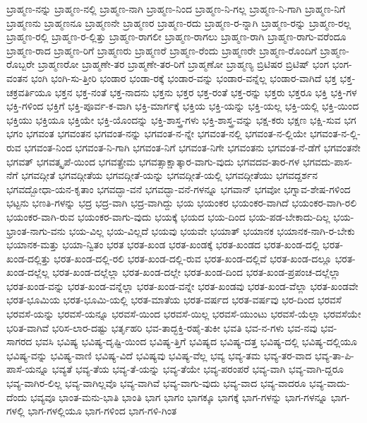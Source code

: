{ಬ್ರಾಹ್ಮಣ-ನನ್ನು
ಬ್ರಾಹ್ಮಣ-ನಲ್ಲಿ
ಬ್ರಾಹ್ಮಣ-ನಾಗಿ
ಬ್ರಾಹ್ಮಣ-ನಿಂದ
ಬ್ರಾಹ್ಮಣ-ನಿ-ಗಲ್ಲ
ಬ್ರಾಹ್ಮಣ-ನಿ-ಗಾಗಿ
ಬ್ರಾಹ್ಮಣ-ನಿಗೆ
ಬ್ರಾಹ್ಮಣನು
ಬ್ರಾಹ್ಮಣನೂ
ಬ್ರಾಹ್ಮಣನೇ
ಬ್ರಾಹ್ಮಣರ
ಬ್ರಾಹ್ಮಣ-ರದು
ಬ್ರಾಹ್ಮಣ-ರ-ನ್ನಾಗಿ
ಬ್ರಾಹ್ಮಣ-ರನ್ನು
ಬ್ರಾಹ್ಮಣ-ರಲ್ಲ
ಬ್ರಾಹ್ಮಣ-ರಲ್ಲಿ
ಬ್ರಾಹ್ಮಣ-ರ-ಲ್ಲಿತ್ತು
ಬ್ರಾಹ್ಮಣ-ರಾಗಲೀ
ಬ್ರಾಹ್ಮಣ-ರಾಗಲು
ಬ್ರಾಹ್ಮಣ-ರಾಗಿ
ಬ್ರಾಹ್ಮಣ-ರಾಗು-ವರೆಂದೂ
ಬ್ರಾಹ್ಮಣ-ರಾದ
ಬ್ರಾಹ್ಮಣ-ರಿಗೆ
ಬ್ರಾಹ್ಮಣರು
ಬ್ರಾಹ್ಮಣರೆ
ಬ್ರಾಹ್ಮಣ-ರೆಂದು
ಬ್ರಾಹ್ಮಣರೇ
ಬ್ರಾಹ್ಮಣ-ರೊಂದಿಗೆ
ಬ್ರಾಹ್ಮಣ-ರೊಬ್ಬರೇ
ಬ್ರಾಹ್ಮಣರೋ
ಬ್ರಾಹ್ಮಣೇ-ತರ
ಬ್ರಾಹ್ಮಣೇ-ತರ-ರಿಗೆ
ಬ್ರಾಹ್ಮಣೋ
ಬ್ರಾಹ್ಮಣ್ಯ
ಬ್ರಿಟಿಷರ
ಬ್ರಿಟಿಷ್
ಭಂಗ
ಭಂಗ-ವಂತನ
ಭಂಗಿ
ಭಂಗಿ-ಸು-ತ್ತೀರಿ
ಭಂಡಾರ
ಭಂಡಾ-ರಕ್ಕೆ
ಭಂಡಾರ-ವನ್ನು
ಭಂಡಾರ-ವನ್ನೆಲ್ಲ
ಭಂಡಾರ-ವಾಗಿದೆ
ಭಕ್ತ
ಭಕ್ತ-ಚಕ್ರವರ್ತಿಯೂ
ಭಕ್ತನ
ಭಕ್ತ-ನಂತೆ
ಭಕ್ತ-ನಾದನು
ಭಕ್ತನು
ಭಕ್ತರ
ಭಕ್ತ-ರಂತೆ
ಭಕ್ತ-ರನ್ನು
ಭಕ್ತರು
ಭಕ್ತರೂ
ಭಕ್ತಿ
ಭಕ್ತಿ-ಗಳ
ಭಕ್ತಿ-ಗಳಿಂದ
ಭಕ್ತಿಗೆ
ಭಕ್ತಿ-ಪೂರ್ವ-ಕ-ವಾಗಿ
ಭಕ್ತಿ-ಮಾರ್ಗಕ್ಕೆ
ಭಕ್ತಿಯ
ಭಕ್ತಿ-ಯನ್ನು
ಭಕ್ತಿ-ಯಲ್ಲ
ಭಕ್ತಿ-ಯಲ್ಲಿ
ಭಕ್ತಿ-ಯಿಂದ
ಭಕ್ತಿಯು
ಭಕ್ತಿಯೂ
ಭಕ್ತಿಯೇ
ಭಕ್ತಿ-ಯೊಂದನ್ನು
ಭಕ್ತಿ-ಶಾಸ್ತ್ರ-ಗಳು
ಭಕ್ತಿ-ಶಾಸ್ತ್ರ-ವನ್ನು
ಭಕ್ಷ-ಕರು
ಭಕ್ಷಣ
ಭಕ್ಷಿ-ಸುವ
ಭಗ
ಭಗಂ
ಭಗವಂತ
ಭಗವಂತನ
ಭಗವಂತ-ನನ್ನು
ಭಗವಂತ-ನ-ನ್ನೇ
ಭಗವಂತ-ನಲ್ಲಿ
ಭಗವಂತ-ನ-ಲ್ಲಿಯೇ
ಭಗವಂತ-ನ-ಲ್ಲಿ-ರುವ
ಭಗವಂತ-ನಿಂದ
ಭಗವಂತ-ನಿ-ಗಾಗಿ
ಭಗವಂತ-ನಿಗೆ
ಭಗವಂತ-ನಿಗೇ
ಭಗವಂತನು
ಭಗವಂತ-ನೆ-ಡೆಗೆ
ಭಗವಂತನೇ
ಭಗವತ್
ಭಗವತ್ಕೃಪೆ-ಯಿಂದ
ಭಗವತ್ಪ್ರೇಮ
ಭಗವತ್ಸಾಕ್ಷಾತ್ಕಾರ-ವಾಗು-ವುದು
ಭಗವದವ-ತಾರ-ಗಳ
ಭಗವದು-ಪಾಸ-ನೆಗೆ
ಭಗವದ್ಗೀತೆ
ಭಗವದ್ಗೀತೆಯ
ಭಗವದ್ಗೀತೆ-ಯನ್ನು
ಭಗವದ್ಗೀತೆ-ಯಲ್ಲಿ
ಭಗವದ್ಗೀತೆಯು
ಭಗವದ್ದರ್ಶನ
ಭಗವದ್ಬೋಧಾ-ಯನ-ಕೃತಾಂ
ಭಗವದ್ಭಾ-ವನೆ
ಭಗವದ್ಭಾ-ವನೆ-ಗಳನ್ನೂ
ಭಗವಾನ್
ಭಗವೋ
ಭಗ್ನಾವ-ಶೇಷ-ಗಳಿಂದ
ಭಟ್ಟನು
ಭಣತಿ-ಗಳನ್ನು
ಭದ್ರ
ಭದ್ರ-ವಾಗಿ
ಭದ್ರ-ವಾಗಿದ್ದು
ಭಯ
ಭಯಂಕರ
ಭಯಂಕರ-ವಾಗಿದೆ
ಭಯಂಕರ-ವಾಗಿ-ರಲಿ
ಭಯಂಕರ-ವಾಗಿ-ರುವ
ಭಯಂಕರ-ವಾಗು-ವುದು
ಭಯಕ್ಕೆ
ಭಯದ
ಭಯ-ದಿಂದ
ಭಯ-ಪಡ-ಬೇಕಾದು-ದಿಲ್ಲ
ಭಯ-ಭ್ರಾಂತ-ನಾಗು-ವನು
ಭಯ-ವಿಲ್ಲ
ಭಯ-ವಿಲ್ಲದೆ
ಭಯವು
ಭಯವೇ
ಭಯಾತ್
ಭಯಾನಕ
ಭಯಾನಕ-ನಾಗಿ-ರ-ಬೇಕು
ಭಯಾನಕ-ಮತ್ತು
ಭಯಾ-ನ್ವಿತಂ
ಭರತ
ಭರತ-ಖಂಡ
ಭರತ-ಖಂಡಕ್ಕೆ
ಭರತ-ಖಂಡದ
ಭರತ-ಖಂಡ-ದಲ್ಲಿ
ಭರತ-ಖಂಡ-ದಲ್ಲಿತ್ತು
ಭರತ-ಖಂಡ-ದಲ್ಲಿ-ರಲಿ
ಭರತ-ಖಂಡ-ದಲ್ಲಿ-ರುವ
ಭರತ-ಖಂಡ-ದಲ್ಲಿವೆ
ಭರತ-ಖಂಡ-ದಲ್ಲೂ
ಭರತ-ಖಂಡ-ದಲ್ಲೆಲ್ಲ
ಭರತ-ಖಂಡ-ದಲ್ಲೆಲ್ಲಾ
ಭರತ-ಖಂಡ-ದಲ್ಲೇ
ಭರತ-ಖಂಡ-ದಿಂದ
ಭರತ-ಖಂಡ-ಪ್ರಪಂಚ-ದಲ್ಲೆಲ್ಲಾ
ಭರತ-ಖಂಡ-ವನ್ನು
ಭರತ-ಖಂಡ-ವನ್ನೆಲ್ಲಾ
ಭರತ-ಖಂಡ-ವನ್ನೇ
ಭರತ-ಖಂಡವು
ಭರತ-ಖಂಡ-ವೆಲ್ಲಾ
ಭರತ-ಖಂಡವೇ
ಭರತ-ಭೂಮಿಯ
ಭರತ-ಭೂಮಿ-ಯಲ್ಲಿ
ಭರತ-ಮಾತೆಯ
ಭರತ-ವರ್ಷದ
ಭರತ-ವರ್ಷವು
ಭರ-ದಿಂದ
ಭರವಸೆ
ಭರವಸೆ-ಯನ್ನು
ಭರವಸೆ-ಯನ್ನೂ
ಭರವಸೆ-ಯಿಂದ
ಭರವಸೆ-ಯಿಲ್ಲ
ಭರವಸೆ-ಯುಂಟು
ಭರವಸೆ-ಯೆಲ್ಲಾ
ಭರವಸೆಯೇ
ಭರಿತ-ವಾಗಿವೆ
ಭರಿಸ-ಲಾರ-ದಷ್ಟು
ಭರ್ತೃಹರಿ
ಭವ-ತಾದ್ಭಕ್ತಿ-ರಹೈ-ತುಕೀ
ಭವತಿ
ಭವ-ನ-ಗಳು
ಭವ-ನವು
ಭವ-ಸಾಗರದ
ಭವಸಿ
ಭವಿಷ್ಯ
ಭವಿಷ್ಯ-ದೃಷ್ಟಿ-ಯಿಂದ
ಭವಿಷ್ಯ-ತ್ತಿಗೆ
ಭವಿಷ್ಯದ
ಭವಿಷ್ಯ-ದತ್ತ
ಭವಿಷ್ಯ-ದಲ್ಲಿ
ಭವಿಷ್ಯ-ದಲ್ಲಿಯೂ
ಭವಿಷ್ಯ-ವನ್ನು
ಭವಿಷ್ಯ-ವಾಣಿ
ಭವಿಷ್ಯ-ವಿದೆ
ಭವಿಷ್ಯವು
ಭವಿಷ್ಯ-ವೆಲ್ಲ
ಭವ್ಯ
ಭವ್ಯ-ತಮ
ಭವ್ಯ-ತರ-ವಾದ
ಭವ್ಯ-ತಾ-ಪಿ-ಪಾಸೆ-ಯನ್ನೂ
ಭವ್ಯತೆ
ಭವ್ಯ-ತೆಯ
ಭವ್ಯ-ತೆ-ಯನ್ನು
ಭವ್ಯ-ತೆಯೇ
ಭವ್ಯ-ಪರಂಪರೆ
ಭವ್ಯ-ವಾಗಿ
ಭವ್ಯ-ವಾಗಿ-ದ್ದರೂ
ಭವ್ಯ-ವಾಗಿರ-ಲಿಲ್ಲ
ಭವ್ಯ-ವಾಗಿಲ್ಲವೊ
ಭವ್ಯ-ವಾಗಿವೆ
ಭವ್ಯ-ವಾಗು-ವುದು
ಭವ್ಯ-ವಾದ
ಭವ್ಯ-ವಾದರೂ
ಭವ್ಯ-ವಾದು-ದೆಂದು
ಭವ್ಯವೂ
ಭಾಂತ-ಮನು-ಭಾತಿ
ಭಾಂತಿ
ಭಾಗ
ಭಾಗಂ
ಭಾಗಕ್ಕೂ
ಭಾಗಕ್ಕೆ
ಭಾಗ-ಗಳನ್ನು
ಭಾಗ-ಗಳನ್ನೂ
ಭಾಗ-ಗಳಲ್ಲಿ
ಭಾಗ-ಗಳಲ್ಲಿಯೂ
ಭಾಗ-ಗಳಿಂದ
ಭಾಗ-ಗಳಿ-ಗಿಂತ
}
